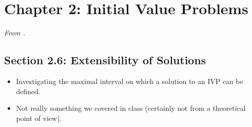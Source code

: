 \documentclass[../notes.tex]{subfiles}
\begin{document}
\section{Chapter 2: Initial Value Problems}
\emph{From \textcite{bib:Teschl}.}
\subsection*{Section 2.6: Extensibility of Solutions}
\begin{itemize}
    \item {}Investigating the maximal interval on which a solution to an IVP can be defined.
    \item Not really something we covered in class (certainly not from a theoretical point of view).
\end{itemize}
\end{document}
